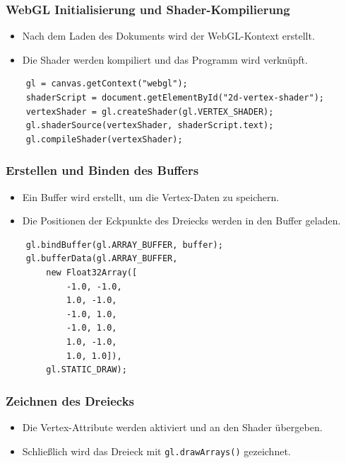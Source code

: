 \documentclass{beamer}
\begin{document}
\begin{frame}[fragile]
    \frametitle{WebGL Initialisierung und Shader-Kompilierung}
    \begin{itemize}
        \item Nach dem Laden des Dokuments wird der WebGL-Kontext erstellt.
        \item Die Shader werden kompiliert und das Programm wird verknüpft.
    \end{itemize}
    \begin{verbatim}
    gl = canvas.getContext("webgl");
    shaderScript = document.getElementById("2d-vertex-shader");
    vertexShader = gl.createShader(gl.VERTEX_SHADER);
    gl.shaderSource(vertexShader, shaderScript.text);
    gl.compileShader(vertexShader);
    \end{verbatim}
\end{frame}

\begin{frame}[fragile]
    \frametitle{Erstellen und Binden des Buffers}
    \begin{itemize}
        \item Ein Buffer wird erstellt, um die Vertex-Daten zu speichern.
        \item Die Positionen der Eckpunkte des Dreiecks werden in den Buffer geladen.
    \end{itemize}
    \begin{verbatim}
    gl.bindBuffer(gl.ARRAY_BUFFER, buffer);
    gl.bufferData(gl.ARRAY_BUFFER, 
        new Float32Array([
            -1.0, -1.0,
            1.0, -1.0,
            -1.0, 1.0,
            -1.0, 1.0,
            1.0, -1.0,
            1.0, 1.0]), 
        gl.STATIC_DRAW);
    \end{verbatim}
\end{frame}

\begin{frame}
    \frametitle{Zeichnen des Dreiecks}
    \begin{itemize}
        \item Die Vertex-Attribute werden aktiviert und an den Shader übergeben.
        \item Schließlich wird das Dreieck mit \texttt{gl.drawArrays()} gezeichnet.
    \end{itemize}
\end{frame}
\end{document}
